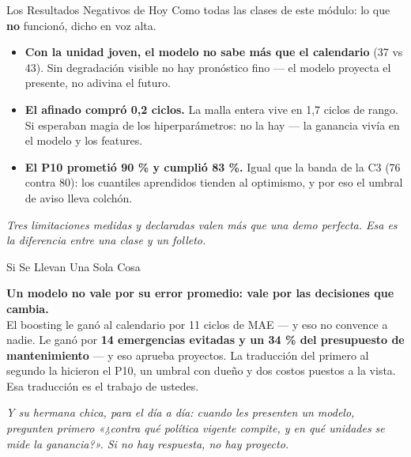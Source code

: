 \documentclass[aspectratio=169, 11pt]{beamer}
\begin{document}
\begin{frame}[shrink=8]{Los Resultados Negativos de Hoy}
  \vspace{2pt}
  {\footnotesize\color{textMuted}
  Como todas las clases de este módulo: lo que \textbf{no} funcionó,
  dicho en voz alta.}
  \vspace{8pt}
  {\footnotesize
    \begin{itemize}\setlength{\itemsep}{9pt}
    \item[{\color{arcaRed}\faTimesCircle}]
      \textbf{Con la unidad joven, el modelo no sabe más que el
      calendario} (37 vs 43). Sin degradación visible no hay pronóstico
      fino --- el modelo proyecta el presente, no adivina el futuro.
    \item[{\color{arcaRed}\faTimesCircle}]
      \textbf{El afinado compró 0,2 ciclos.} La malla entera vive en 1,7
      ciclos de rango. Si esperaban magia de los hiperparámetros: no la
      hay --- la ganancia vivía en el modelo y los features.
    \item[{\color{arcaRed}\faTimesCircle}]
      \textbf{El P10 prometió 90 \% y cumplió 83 \%.} Igual que la banda
      de la C3 (76 contra 80): los cuantiles aprendidos tienden al
      optimismo, y por eso el umbral de aviso lleva colchón.
    \end{itemize}}
  \vspace{7pt}
  {\scriptsize\color{arcaDark}\itshape
   Tres limitaciones medidas y declaradas valen más que una demo
   perfecta. Esa es la diferencia entre una clase y un folleto.}
\end{frame}

\begin{frame}[shrink=8]{Si Se Llevan Una Sola Cosa}
  \vspace{6pt}
  \begin{tcolorbox}[colback=arcaGray, colframe=arcaRed, boxrule=0pt,
    leftrule=4pt, arc=3pt, left=12pt, right=12pt, top=10pt, bottom=10pt]
    {\large\color{arcaDark}\bfseries
     Un modelo no vale por su error promedio: vale por las decisiones
     que cambia.}\\[8pt]
    {\footnotesize\color{textMuted}
     El boosting le ganó al calendario por 11 ciclos de MAE --- y eso no
     convence a nadie. Le ganó por \textbf{14 emergencias evitadas y un
     34 \% del presupuesto de mantenimiento} --- y eso aprueba proyectos.
     La traducción del primero al segundo la hicieron el P10, un umbral
     con dueño y dos costos puestos a la vista. Esa traducción es el
     trabajo de ustedes.}
  \end{tcolorbox}
  \vspace{8pt}
  {\footnotesize\color{arcaDark}\itshape
   Y su hermana chica, para el día a día: cuando les presenten un modelo,
   pregunten primero \emph{«¿contra qué política vigente compite, y en
   qué unidades se mide la ganancia?»}. Si no hay respuesta, no hay
   proyecto.}
\end{frame}
\end{document}
